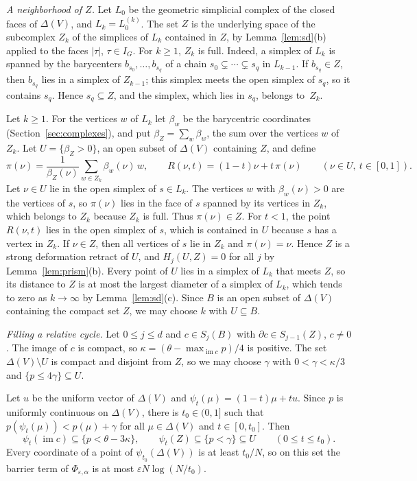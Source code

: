\documentclass[11pt]{article}
\theoremstyle{definition}
\numberwithin{equation}{section}
\DeclareMathOperator{\im}{im}
\begin{document}
\emph{A neighborhood of $Z$.} Let $L_0$ be the geometric simplicial complex of the closed faces of $\Delta(V)$, and $L_k=L_0^{(k)}$. The set $Z$ is the underlying space of the subcomplex $Z_k$ of the simplices of $L_k$ contained in $Z$, by Lemma~\ref{lem:sd}(b) applied to the faces $|\tau|$, $\tau\in I_G$. For $k\ge1$, $Z_k$ is full. Indeed, a simplex of $L_k$ is spanned by the barycenters $b_{s_0},\ldots,b_{s_q}$ of a chain $s_0\subsetneq\cdots\subsetneq s_q$ in $L_{k-1}$. If $b_{s_q}\in Z$, then $b_{s_q}$ lies in a simplex of $Z_{k-1}$; this simplex meets the open simplex of $s_q$, so it contains $s_q$. Hence $s_q\subseteq Z$, and the simplex, which lies in $s_q$, belongs to~$Z_k$.

Let $k\ge1$. For the vertices $w$ of $L_k$ let $\beta_w$ be the barycentric coordinates (Section~\ref{sec:complexes}), and put $\beta_Z=\sum_w\beta_w$, the sum over the vertices $w$ of $Z_k$. Let $U=\{\beta_Z>0\}$, an open subset of $\Delta(V)$ containing $Z$, and define
\begin{equation*}
 \pi(\nu)=\frac1{\beta_Z(\nu)}\sum_{w\in Z_k}\beta_w(\nu)\,w,\qquad
 R(\nu,t)=(1-t)\nu+t\,\pi(\nu)\qquad(\nu\in U,\ t\in[0,1]).
\end{equation*}
Let $\nu\in U$ lie in the open simplex of $s\in L_k$. The vertices $w$ with $\beta_w(\nu)>0$ are the vertices of $s$, so $\pi(\nu)$ lies in the face of $s$ spanned by its vertices in $Z_k$, which belongs to $Z_k$ because $Z_k$ is full. Thus $\pi(\nu)\in Z$. For $t<1$, the point $R(\nu,t)$ lies in the open simplex of $s$, which is contained in $U$ because $s$ has a vertex in $Z_k$. If $\nu\in Z$, then all vertices of $s$ lie in $Z_k$ and $\pi(\nu)=\nu$. Hence $Z$ is a strong deformation retract of $U$, and $H_j(U,Z)=0$ for all $j$ by Lemma~\ref{lem:prism}(b). Every point of $U$ lies in a simplex of $L_k$ that meets $Z$, so its distance to $Z$ is at most the largest diameter of a simplex of $L_k$, which tends to zero as $k\to\infty$ by Lemma~\ref{lem:sd}(c). Since $B$ is an open subset of $\Delta(V)$ containing the compact set $Z$, we may choose $k$ with $U\subseteq B$.

\emph{Filling a relative cycle.} Let $0\le j\le d$ and $c\in S_j(B)$ with $\partial c\in S_{j-1}(Z)$, $c\ne0$. The image of $c$ is compact, so $\kappa=(\theta-\max_{\im c}p)/4$ is positive. The set $\Delta(V)\setminus U$ is compact and disjoint from $Z$, so we may choose $\gamma$ with $0<\gamma<\kappa/3$ and $\{p\le4\gamma\}\subseteq U$.

Let $u$ be the uniform vector of $\Delta(V)$ and $\psi_t(\mu)=(1-t)\mu+tu$. Since $p$ is uniformly continuous on $\Delta(V)$, there is $t_0\in(0,1]$ such that $p(\psi_t(\mu))<p(\mu)+\gamma$ for all $\mu\in\Delta(V)$ and $t\in[0,t_0]$. Then
\begin{equation}\label{eq:push}
 \psi_t(\im c)\subseteq\{p<\theta-3\kappa\},\qquad\psi_t(Z)\subseteq\{p<\gamma\}\subseteq U\qquad(0\le t\le t_0).
\end{equation}
Every coordinate of a point of $\psi_{t_0}(\Delta(V))$ is at least $t_0/N$, so on this set the barrier term of $\Phi_{\varepsilon,\alpha}$ is at most $\varepsilon N\log(N/t_0)$.
\end{document}
